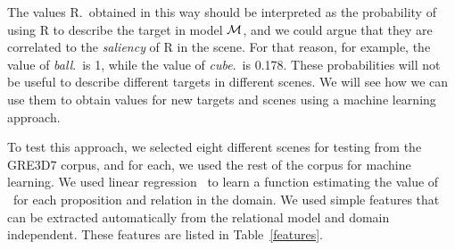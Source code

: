 %
%
%
%
The values R.\puse\ obtained in this way should be interpreted as the probability of using R to describe the target in model $\mathcal{M}$, and we could argue that they are correlated to the \emph{saliency} of R in the scene.  
For that reason, for example, the value of \emph{ball}.\puse\ is 1, while the value of \emph{cube}.\puse\ is 0.178.  These probabilities will not be useful to describe different targets in different scenes.  We will see how we can use them to obtain values for new targets and scenes using a machine learning approach. 




To test this approach, we selected eight different scenes for testing from the GRE3D7 corpus, and for each, we used the rest of the corpus for machine learning. We used linear regression~\cite{Hall:WEK09} to learn a function estimating the value of \puse\ for each proposition and relation in the domain.  We used simple features that can be extracted automatically from the relational model and domain independent. These features are listed in Table~\ref{features}.  

